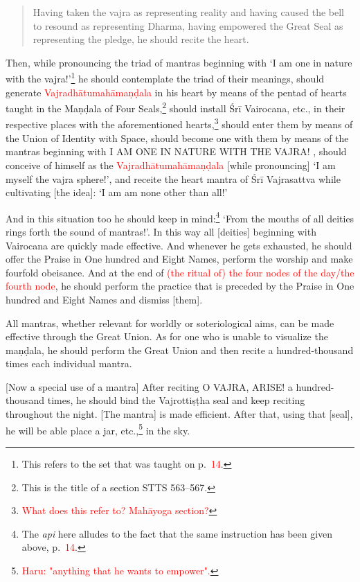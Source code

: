 \documentclass[11pt]{book}
\makeatletter
\def\fakesc#1{%
  \begingroup%
  \xdef\fake@name{\csname\curr@fontshape/\f@size\endcsname}%
  \fontsize{1.3\fontdimen8\fake@name}{\baselineskip}\selectfont%
  \uppercase{#1}%
  \endgroup%
}
\newcommand{\mantra}[1]{\fakesc{#1}}
\newcommand{\red}[1]{\textcolor{red}{#1}}
\newcommand{\skt}[1]{\emph{#1}}
\makeatother
\begin{document}
\begin{verse}
Having taken the vajra as representing reality and having caused the bell to resound as representing Dharma, having empowered the Great Seal as representing the pledge, he should recite the heart.
\end{verse}

Then, while pronouncing the triad of mantras beginning with `I am one in nature with the vajra!'\footnote{This refers to the set that was taught on p.~\red{14}.} he should contemplate the triad of their meanings, should generate \red{Vajradhātumahāmaṇḍala} in his heart by means of the pentad of hearts taught in the Maṇḍala of Four Seals,\footnote{This is the title of a section STTS 563–567.} should install Śrī Vairocana, etc., in their respective places with the aforementioned hearts,\footnote{\red{What does this refer to? Mahāyoga section?}} should enter them by means of the Union of Identity with Space, should become one with them by means of the mantras beginning with \mantra{I am one in nature with the vajra!}, should conceive of himself as the \red{Vajradhātumahāmaṇḍala} [while pronouncing] `I am myself the vajra sphere!', and receite the heart mantra of Śrī Vajrasattva while cultivating [the idea]: `I am am none other than all!'

And in this situation too he should keep in mind:\footnote{The \skt{api} here alludes to the fact that the same instruction has been given above, p.~\red{14}.} `From the mouths of all deities rings forth the sound of mantras!'. In this way all [deities] beginning with Vairocana are quickly made effective. And whenever he gets exhausted, he should offer the Praise in One hundred and Eight Names, perform the worship and make fourfold obeisance. And at the end of \red{(the ritual of) the four nodes of the day/the fourth node}, he should perform the practice that is preceded by the Praise in One hundred and Eight Names and dismiss [them].

All mantras, whether relevant for worldly or soteriological aims, can be made effective through the Great Union. As for one who is unable to visualize the maṇḍala, he should perform the Great Union and then recite a hundred-thousand times each individual mantra. 

[Now a special use of a mantra]
After reciting \mantra{o vajra, arise!} a hundred-thousand times, he should bind the Vajrottiṣṭha seal and keep reciting throughout the night. [The mantra] is made efficient. After that, using that [seal], he will be able place a jar, etc.,\footnote{\red{Haru: "anything that he wants to empower".}} in the sky.
\end{document}

